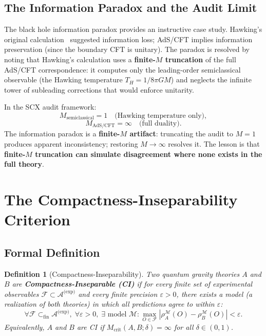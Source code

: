\documentclass[12pt,a4paper]{article}
\newtheorem{definition}[theorem]{Definition}
\theoremstyle{remark}
\newcommand{\F}{\mathcal{F}}
\newcommand{\M}{\mathcal{M}}
\newcommand{\A}{\mathcal{A}}
\newcommand{\CI}{\textsf{CI}}
\begin{document}
\subsection{The Information Paradox and the Audit Limit}

The black hole information paradox provides an instructive case study. Hawking's original calculation~\cite{hawking1976black} suggested information loss; AdS/CFT implies information preservation (since the boundary CFT is unitary). The paradox is resolved by noting that Hawking's calculation uses a \textbf{finite-$M$ truncation} of the full AdS/CFT correspondence: it computes only the leading-order semiclassical observable (the Hawking temperature $T_H = 1/8\pi GM$) and neglects the infinite tower of subleading corrections that would enforce unitarity.

In the SCX audit framework:
\begin{equation}
  M_{\text{semiclassical}} = 1 \quad \text{(Hawking temperature only)},
\end{equation}
\begin{equation}
  M_{\text{AdS/CFT}} = \infty \quad \text{(full duality)}.
\end{equation}
The information paradox is a \textbf{finite-$M$ artifact}: truncating the audit to $M = 1$ produces apparent inconsistency; restoring $M \to \infty$ resolves it. The lesson is that \textbf{finite-$M$ truncation can simulate disagreement where none exists in the full theory}.


\section{The Compactness-Inseparability Criterion}
\label{sec:ci}

\subsection{Formal Definition}

\begin{definition}[Compactness-Inseparability]
\label{def:ci}
Two quantum gravity theories $A$ and $B$ are \textbf{Compactness-Inseparable (\CI{})} if for every finite set of experimental observables $\F \subset \A^{\text{(exp)}}$ and every finite precision $\varepsilon > 0$, there exists a model (a realization of both theories) in which all predictions agree to within $\varepsilon$:
\begin{equation}
  \label{eq:ci_formal}
  \forall \F \subset_{\text{fin}} \A^{\text{(exp)}},\; \forall \varepsilon > 0,\;
  \exists \text{ model } \M : \max_{O \in \F} |\rho_A^{\M}(O) - \rho_B^{\M}(O)| < \varepsilon.
\end{equation}
Equivalently, $A$ and $B$ are \CI{} if $M_{\text{crit}}(A, B; \delta) = \infty$ for all $\delta \in (0, 1)$.
\end{definition}
\end{document}
